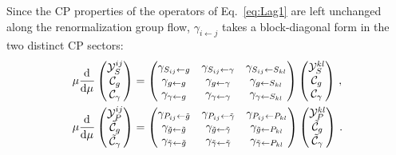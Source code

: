 Since the CP properties of the operators of Eq.~\eqref{eq:Lag1} are left unchanged along the renormalization group flow,
$\gamma_{i \leftarrow j}$ takes a block-diagonal form in the two distinct CP sectors:
%
\begin{align}
\mu\dv[]{}{\mu}
    \begin{pmatrix}
        \mathcal Y_S^{ij} \\ \mathcal C_g \\  \mathcal C_\gamma 
    \end{pmatrix}
    &=
    \begin{pmatrix}
        \gamma_{S_{ij} \leftarrow g} & \gamma_{S_{ij} \leftarrow \gamma} & \gamma_{S_{ij} \leftarrow S_{kl}}\\
        \gamma_{g \leftarrow g} & \gamma_{g \leftarrow \gamma} & \gamma_{g \leftarrow S_{kl}} \\
        \gamma_{\gamma \leftarrow g} & \gamma_{\gamma \leftarrow \gamma} & \gamma_{\gamma \leftarrow S_{kl}} 
    \end{pmatrix}
    \begin{pmatrix}
        \mathcal Y_S^{kl}\\ \mathcal C_g \\ \mathcal C_\gamma 
    \end{pmatrix} \,,
    \\
    \mu\dv[]{}{\mu}
    \begin{pmatrix}
         \mathcal Y_P^{ij}\\\tilde{\mathcal C}_g \\ \tilde{\mathcal C}_\gamma 
    \end{pmatrix}
    &=
    \begin{pmatrix}
        \gamma_{P_{ij} \leftarrow \tilde g} & \gamma_{P_{ij} \leftarrow \tilde \gamma} & \gamma_{P_{ij} \leftarrow P_{kl}}\\
        \gamma_{\tilde g \leftarrow \tilde g} & \gamma_{\tilde g \leftarrow \tilde \gamma} & \gamma_{\tilde g \leftarrow P_{kl}} \\
        \gamma_{\tilde \gamma \leftarrow \tilde g} & \gamma_{\tilde\gamma \leftarrow \tilde \gamma} & \gamma_{\tilde \gamma \leftarrow P_{kl}} 
    \end{pmatrix}
    \begin{pmatrix}\mathcal Y_P^{kl}\\
\tilde{\mathcal C}_g \\ \tilde{\mathcal C}_\gamma 
\end{pmatrix}\,.
\end{align}